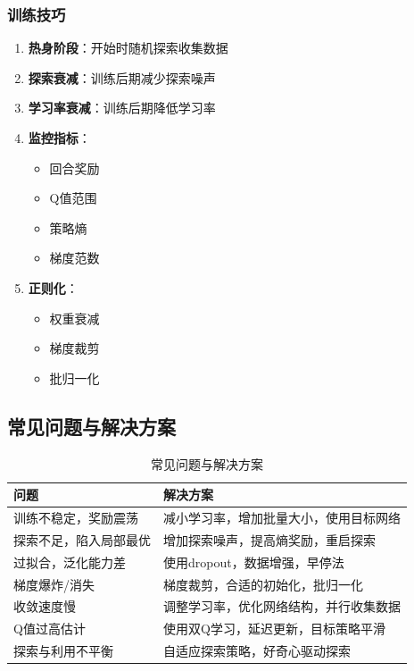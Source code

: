 \subsubsection{训练技巧}
\begin{enumerate}
    \item \textbf{热身阶段}：开始时随机探索收集数据
    \item \textbf{探索衰减}：训练后期减少探索噪声
    \item \textbf{学习率衰减}：训练后期降低学习率
    \item \textbf{监控指标}：
    \begin{itemize}
        \item 回合奖励
        \item Q值范围
        \item 策略熵
        \item 梯度范数
    \end{itemize}
    \item \textbf{正则化}：
    \begin{itemize}
        \item 权重衰减
        \item 梯度裁剪
        \item 批归一化
    \end{itemize}
\end{enumerate}

\subsection{常见问题与解决方案}

\begin{table}[H]
\centering
\caption{常见问题与解决方案}
\begin{tabular}{p{}p{}}
\toprule
\textbf{问题} & \textbf{解决方案} \\
\midrule
训练不稳定，奖励震荡 & 减小学习率，增加批量大小，使用目标网络 \\
探索不足，陷入局部最优 & 增加探索噪声，提高熵奖励，重启探索 \\
过拟合，泛化能力差 & 使用dropout，数据增强，早停法 \\
梯度爆炸/消失 & 梯度裁剪，合适的初始化，批归一化 \\
收敛速度慢 & 调整学习率，优化网络结构，并行收集数据 \\
Q值过高估计 & 使用双Q学习，延迟更新，目标策略平滑 \\
探索与利用不平衡 & 自适应探索策略，好奇心驱动探索 \\
\bottomrule
\end{tabular}
\end{table}

